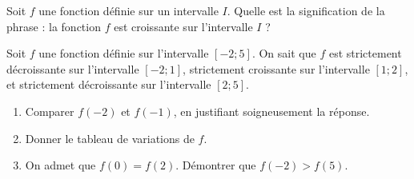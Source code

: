 \documentclass[a4paper,11pt,DIV15,BCOR0mm]{scrartcl}
\begin{document}
\begin{exercice}[Cours]
Soit $f$ une fonction définie sur un intervalle $I$.
Quelle est la signification de la phrase : \og la fonction $f$ est croissante
sur l'intervalle $I$\fg{} ?
\vfill
\end{exercice}



\begin{exercice}
Soit $f$ une fonction définie sur l'intervalle $[-2;5]$. On sait que
$f$ est strictement décroissante sur l'intervalle $[-2;1]$,
strictement croissante sur l'intervalle $[1;2]$, et strictement
décroissante sur l'intervalle $[2;5]$.
\begin{enumerate}
  \item Comparer $f(-2)$ et $f(-1)$, en justifiant soigneusement
  la réponse.
  \vfill
  \item Donner le tableau de variations de $f$.
  \vfill
  \item On admet que $f(0)=f(2)$. Démontrer que $f(-2)>f(5)$.
  \vfill
\end{enumerate}
\end{exercice}
\end{document}

